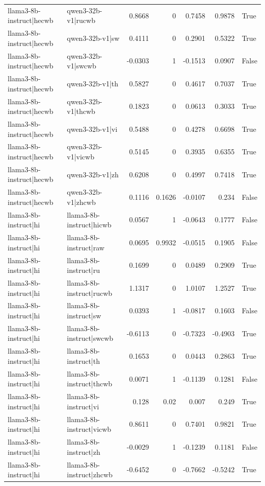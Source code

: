 \begin{table}
\begin{tabular}{l l r r r r l}
llama3-8b-instruct|hecwb & qwen3-32b-v1|rucwb & 0.8668 & 0 & 0.7458 & 0.9878 & True \\
llama3-8b-instruct|hecwb & qwen3-32b-v1|sw & 0.4111 & 0 & 0.2901 & 0.5322 & True \\
llama3-8b-instruct|hecwb & qwen3-32b-v1|swcwb & -0.0303 & 1 & -0.1513 & 0.0907 & False \\
llama3-8b-instruct|hecwb & qwen3-32b-v1|th & 0.5827 & 0 & 0.4617 & 0.7037 & True \\
llama3-8b-instruct|hecwb & qwen3-32b-v1|thcwb & 0.1823 & 0 & 0.0613 & 0.3033 & True \\
llama3-8b-instruct|hecwb & qwen3-32b-v1|vi & 0.5488 & 0 & 0.4278 & 0.6698 & True \\
llama3-8b-instruct|hecwb & qwen3-32b-v1|vicwb & 0.5145 & 0 & 0.3935 & 0.6355 & True \\
llama3-8b-instruct|hecwb & qwen3-32b-v1|zh & 0.6208 & 0 & 0.4997 & 0.7418 & True \\
llama3-8b-instruct|hecwb & qwen3-32b-v1|zhcwb & 0.1116 & 0.1626 & -0.0107 & 0.234 & False \\
llama3-8b-instruct|hi & llama3-8b-instruct|hicwb & 0.0567 & 1 & -0.0643 & 0.1777 & False \\
llama3-8b-instruct|hi & llama3-8b-instruct|raw & 0.0695 & 0.9932 & -0.0515 & 0.1905 & False \\
llama3-8b-instruct|hi & llama3-8b-instruct|ru & 0.1699 & 0 & 0.0489 & 0.2909 & True \\
llama3-8b-instruct|hi & llama3-8b-instruct|rucwb & 1.1317 & 0 & 1.0107 & 1.2527 & True \\
llama3-8b-instruct|hi & llama3-8b-instruct|sw & 0.0393 & 1 & -0.0817 & 0.1603 & False \\
llama3-8b-instruct|hi & llama3-8b-instruct|swcwb & -0.6113 & 0 & -0.7323 & -0.4903 & True \\
llama3-8b-instruct|hi & llama3-8b-instruct|th & 0.1653 & 0 & 0.0443 & 0.2863 & True \\
llama3-8b-instruct|hi & llama3-8b-instruct|thcwb & 0.0071 & 1 & -0.1139 & 0.1281 & False \\
llama3-8b-instruct|hi & llama3-8b-instruct|vi & 0.128 & 0.02 & 0.007 & 0.249 & True \\
llama3-8b-instruct|hi & llama3-8b-instruct|vicwb & 0.8611 & 0 & 0.7401 & 0.9821 & True \\
llama3-8b-instruct|hi & llama3-8b-instruct|zh & -0.0029 & 1 & -0.1239 & 0.1181 & False \\
llama3-8b-instruct|hi & llama3-8b-instruct|zhcwb & -0.6452 & 0 & -0.7662 & -0.5242 & True \\

\end{tabular}
\end{table}
